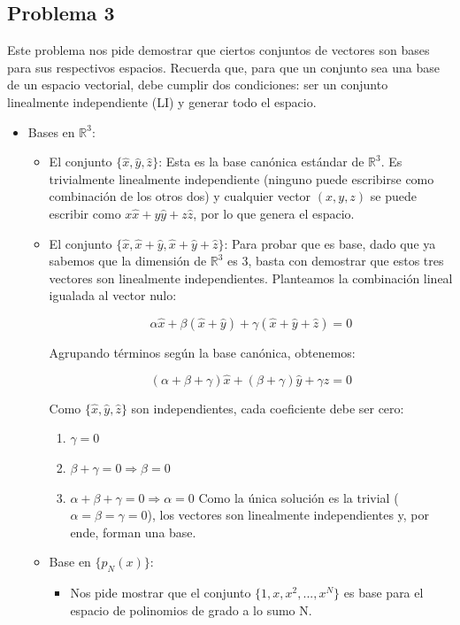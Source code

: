 \documentclass[11pt,spanish]{article}
\newcounter{problema}
\begin{document}
\subsection*{Problema 3}

Este problema nos pide demostrar que ciertos conjuntos de vectores son bases para sus respectivos espacios. Recuerda que, para que un conjunto sea una base de un espacio vectorial, debe cumplir dos condiciones: ser un conjunto linealmente independiente (LI) y generar todo el espacio.

\begin{itemize}
\item[a)] Bases en $\mathbb{R}^{3}$:

\begin{itemize}
\item  
El conjunto $\{\hat{x},\hat{y},\hat{z}\}$: Esta es la base canónica estándar de $\mathbb{R}^{3}$. Es trivialmente linealmente independiente (ninguno puede escribirse como combinación de los otros dos) y cualquier vector $(x, y, z)$ se puede escribir como $x\hat{x} + y\hat{y} + z\hat{z}$, por lo que genera el espacio.

\item
El conjunto $\{\hat{x}, \hat{x}+\hat{y}, \hat{x}+\hat{y}+\hat{z}\}$: Para probar que es base, dado que ya sabemos que la dimensión de $\mathbb{R}^{3}$ es 3, basta con demostrar que estos tres vectores son linealmente independientes. Planteamos la combinación lineal igualada al vector nulo:

$$\alpha\hat{x} + \beta(\hat{x}+\hat{y}) + \gamma(\hat{x}+\hat{y}+\hat{z}) = 0$$

Agrupando términos según la base canónica, obtenemos:

$$(\alpha + \beta + \gamma)\hat{x} + (\beta + \gamma)\hat{y} + \gamma\hat{z} = 0$$

Como $\{\hat{x},\hat{y},\hat{z}\}$ son independientes, cada coeficiente debe ser cero:
\begin{enumerate}
\item $\gamma = 0$
\item $\beta + \gamma = 0 \Rightarrow \beta = 0$
\item $\alpha + \beta + \gamma = 0 \Rightarrow \alpha = 0$
Como la única solución es la trivial ($\alpha=\beta=\gamma=0$), los vectores son linealmente independientes y, por ende, forman una base.
\end{enumerate}

\item[b)] Base en $\{p_{N}(x)\}$:
\begin{itemize}
\item Nos pide mostrar que el conjunto $\{1,x,x^{2},...,x^{N}\}$ es base para el espacio de polinomios de grado a lo sumo N.


\end{itemize}
\end{itemize}
\end{itemize}
\end{document}
